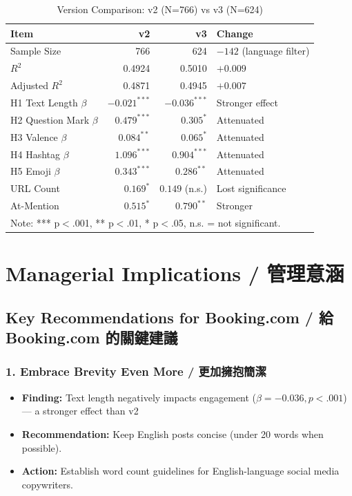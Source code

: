 \documentclass[12pt,a4paper]{article}
\begin{document}
\begin{table}[H]
\centering
\caption{Version Comparison: v2 (N=766) vs v3 (N=624)}
\small
\begin{tabular}{lrrl}
\toprule
Item & v2 & v3 & Change \\
\midrule
Sample Size & 766 & 624 & $-142$ (language filter) \\
$R^2$ & 0.4924 & 0.5010 & $+0.009$ \\
Adjusted $R^2$ & 0.4871 & 0.4945 & $+0.007$ \\
H1 Text Length $\beta$ & $-0.021^{***}$ & $-0.036^{***}$ & Stronger effect \\
H2 Question Mark $\beta$ & $0.479^{***}$ & $0.305^{*}$ & Attenuated \\
H3 Valence $\beta$ & $0.084^{**}$ & $0.065^{*}$ & Attenuated \\
H4 Hashtag $\beta$ & $1.096^{***}$ & $0.904^{***}$ & Attenuated \\
H5 Emoji $\beta$ & $0.343^{***}$ & $0.286^{**}$ & Attenuated \\
URL Count & $0.169^{*}$ & $0.149$ (n.s.) & Lost significance \\
At-Mention & $0.515^{*}$ & $0.790^{**}$ & Stronger \\
\bottomrule
\multicolumn{4}{l}{\small Note: *** p$<$.001, ** p$<$.01, * p$<$.05, n.s. = not significant.} \\
\end{tabular}
\end{table}

\newpage

\section{Managerial Implications / 管理意涵}

\subsection{Key Recommendations for Booking.com / 給 Booking.com 的關鍵建議}

\subsubsection{1. Embrace Brevity Even More / 更加擁抱簡潔}
\begin{itemize}
    \item \textbf{Finding:} Text length negatively impacts engagement ($\beta = -0.036, p < .001$) — a stronger effect than v2
    \item \textbf{Recommendation:} Keep English posts concise (under 20 words when possible).
    \item \textbf{Action:} Establish word count guidelines for English-language social media copywriters.
\end{itemize}
\end{document}
